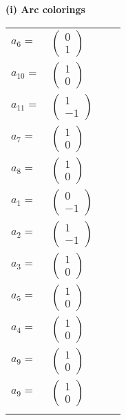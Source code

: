 \documentclass[1p]{elsarticle_modified}
\theoremstyle{definition}
\begin{document}
\flushleft \textbf{(i) Arc colorings}\\
\begin{tabular}{m{7pt} m{180pt} m{7pt} m{180pt} }
\flushright $a_{6}=$&$\begin{pmatrix}0\\1\end{pmatrix}$ \\
\flushright $a_{10}=$&$\begin{pmatrix}1\\0\end{pmatrix}$ \\
\flushright $a_{11}=$&$\begin{pmatrix}1\\-1\end{pmatrix}$ \\
\flushright $a_{7}=$&$\begin{pmatrix}1\\0\end{pmatrix}$ \\
\flushright $a_{8}=$&$\begin{pmatrix}1\\0\end{pmatrix}$ \\
\flushright $a_{1}=$&$\begin{pmatrix}0\\-1\end{pmatrix}$ \\
\flushright $a_{2}=$&$\begin{pmatrix}1\\-1\end{pmatrix}$ \\
\flushright $a_{3}=$&$\begin{pmatrix}1\\0\end{pmatrix}$ \\
\flushright $a_{5}=$&$\begin{pmatrix}1\\0\end{pmatrix}$ \\
\flushright $a_{4}=$&$\begin{pmatrix}1\\0\end{pmatrix}$ \\
\flushright $a_{9}=$&$\begin{pmatrix}1\\0\end{pmatrix}$\\ \flushright $a_{9}=$&$\begin{pmatrix}1\\0\end{pmatrix}$\\&\end{tabular}
\end{document}
